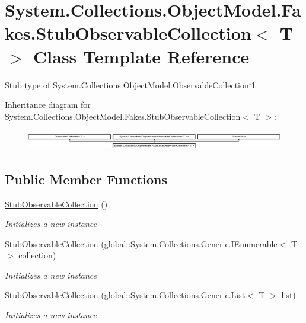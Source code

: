 \hypertarget{class_system_1_1_collections_1_1_object_model_1_1_fakes_1_1_stub_observable_collection_3_01_t_01_4}{\section{System.\-Collections.\-Object\-Model.\-Fakes.\-Stub\-Observable\-Collection$<$ T $>$ Class Template Reference}
\label{class_system_1_1_collections_1_1_object_model_1_1_fakes_1_1_stub_observable_collection_3_01_t_01_4}
}


Stub type of System.\-Collections.\-Object\-Model.\-Observable\-Collection`1 


Inheritance diagram for System.\-Collections.\-Object\-Model.\-Fakes.\-Stub\-Observable\-Collection$<$ T $>$\-:\begin{figure}[H]
\begin{center}
\leavevmode
\includegraphics[height=0.884676cm]{class_system_1_1_collections_1_1_object_model_1_1_fakes_1_1_stub_observable_collection_3_01_t_01_4}
\end{center}
\end{figure}
\subsection*{Public Member Functions}
\begin{DoxyCompactItemize}
\item 
\hyperlink{class_system_1_1_collections_1_1_object_model_1_1_fakes_1_1_stub_observable_collection_3_01_t_01_4_ac7065e7c11f4a0a9c6ad446d8aabb179}{Stub\-Observable\-Collection} ()
\begin{DoxyCompactList}\small\item\em Initializes a new instance\end{DoxyCompactList}\item 
\hyperlink{class_system_1_1_collections_1_1_object_model_1_1_fakes_1_1_stub_observable_collection_3_01_t_01_4_a531aef8c250ae83e12889bf63d22860d}{Stub\-Observable\-Collection} (global\-::\-System.\-Collections.\-Generic.\-I\-Enumerable$<$ T $>$ collection)
\begin{DoxyCompactList}\small\item\em Initializes a new instance\end{DoxyCompactList}\item 
\hyperlink{class_system_1_1_collections_1_1_object_model_1_1_fakes_1_1_stub_observable_collection_3_01_t_01_4_aa6844a9d480e46b7ef3732ba704e2426}{Stub\-Observable\-Collection} (global\-::\-System.\-Collections.\-Generic.\-List$<$ T $>$ list)
\begin{DoxyCompactList}\small\item\em Initializes a new instance\end{DoxyCompactList}\end{DoxyCompactItemize}

